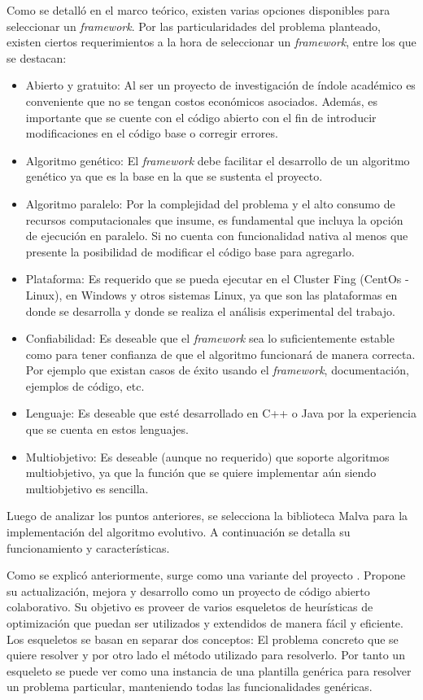 Como se detalló en el marco teórico, existen varias opciones disponibles para seleccionar un \emph{framework}. Por las particularidades del problema planteado, existen ciertos requerimientos a la hora de seleccionar un \emph{framework}, entre los que se destacan:

\begin{itemize}
	\item Abierto y gratuito: Al ser un proyecto de investigación de índole académico es conveniente que no se tengan costos económicos asociados. Además, es importante que se cuente con el código abierto con el fin de introducir modificaciones en el código base o corregir errores.
	\item Algoritmo genético: El \emph{framework} debe facilitar el desarrollo de un algoritmo genético ya que es la base en la que se sustenta el proyecto.
	\item Algoritmo paralelo: Por la complejidad del problema y el alto consumo de recursos computacionales que insume, es fundamental que incluya la opción de ejecución en paralelo. Si no cuenta con funcionalidad nativa al menos que presente la posibilidad de modificar el código base para agregarlo.
	\item Plataforma: Es requerido que se pueda ejecutar en el Cluster Fing (CentOs - Linux), en Windows y otros sistemas Linux, ya que son las plataformas en donde se desarrolla y donde se realiza el análisis experimental del trabajo.
	\item Confiabilidad: Es deseable que el \emph{framework} sea lo suficientemente estable como para tener confianza de que el algoritmo funcionará de manera correcta. Por ejemplo que existan casos de éxito usando el \emph{framework}, documentación, ejemplos de código, etc.
	\item Lenguaje: Es deseable que esté desarrollado en C++ o Java por la experiencia que se cuenta en estos lenguajes. 
	\item Multiobjetivo: Es deseable (aunque no requerido) que soporte algoritmos multiobjetivo, ya que la función que se quiere implementar aún siendo multiobjetivo es sencilla.	
\end{itemize} 

Luego de analizar los puntos anteriores, se selecciona la biblioteca Malva para la implementación del algoritmo evolutivo. A continuación se detalla su funcionamiento y características.

Como se explicó anteriormente, \citet{Malva} surge como una variante del proyecto \citet{Mallba}. Propone su actualización, mejora y desarrollo como un proyecto de código abierto colaborativo.  Su objetivo es proveer de varios esqueletos de heurísticas de optimización que puedan ser utilizados y extendidos de manera fácil y eficiente. Los esqueletos se basan en separar dos conceptos: El problema concreto que se quiere resolver y por otro lado el método utilizado para resolverlo. Por tanto un esqueleto se puede ver como una instancia de una plantilla genérica para resolver un problema particular, manteniendo todas las funcionalidades genéricas.

